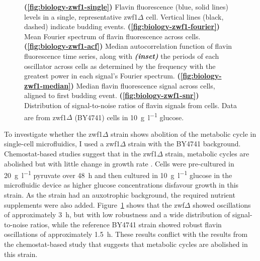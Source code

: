 \begin{figure}
  \caption{
    \textbf{(\ref{fig:biology-zwf1-single})}
    Flavin fluorescence (blue, solid lines) levels in a single, representative zwf1$\Delta$ cell.
    Vertical lines (black, dashed) indicate budding events.
    \textbf{(\ref{fig:biology-zwf1-fourier})}
    Mean Fourier spectrum of flavin fluorescence across cells.
    \textbf{(\ref{fig:biology-zwf1-acf})}
    Median autocorrelation function of flavin fluorescence time series, along with \textit{\textbf{(inset)}} the periods of each oscillator across cells as determined by the frequency with the greatest power in each signal's Fourier spectrum.
    \textbf{(\ref{fig:biology-zwf1-median})}
    Median flavin fluorescence signal across cells, aligned to first budding event.
    \textbf{(\ref{fig:biology-zwf1-snr})}
    Distribution of signal-to-noise ratios of flavin signals from cells.
    Data are from zwf1$\Delta$ (BY4741) cells in \SI{10}{\gram~\litre^{-1}} glucose.
  }
  \label{fig:biology-zwf1}
\end{figure}


To investigate whether the zwf1$\Delta$ strain shows abolition of the metabolic cycle in single-cell microfluidics, I used a zwf1$\Delta$ strain with the BY4741 background.
Chemostat-based studies suggest that in the zwf1$\Delta$ strain, metabolic cycles are abolished but with little change in growth rate \parencite{tuCyclicChangesMetabolic2007}.
Cells were pre-cultured in \SI{20}{\gram~\litre^{-1}} pyruvate over \SI{48}{\hour} and then cultured in \SI{10}{\gram~\litre^{-1}} glucose in the microfluidic device as higher glucose concentrations disfavour growth in this strain.
As the strain had an auxotrophic background, the required nutrient supplements were also added.
%
Figure~\ref{fig:biology-zwf1} shows that the zwf$\Delta$ showed oscillations of approximately \SI{3}{\hour}, but with low robustness and a wide distribution of signal-to-noise ratios, while the reference BY4741 strain showed robust flavin oscillations of approximately \SI{1.5}{\hour}.
These results conflict with the results from the chemostat-based study \parencite{tuCyclicChangesMetabolic2007} that suggests that metabolic cycles are abolished in this strain.


